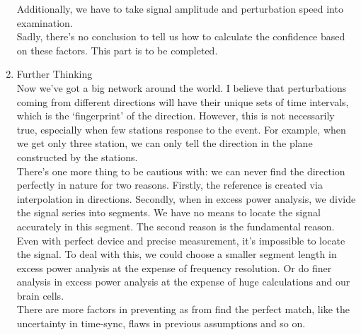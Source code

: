 \documentclass[
12pt, %
a4paper %
]{extreport}
\theoremstyle{plain}
\begin{document}
\begin{enumerate}
Additionally, we have to take signal amplitude and perturbation speed into examination. \\
Sadly, there’s no conclusion to tell us how to calculate the confidence based on these factors. This part is to be completed.
\item Further Thinking\\
Now we’ve got a big network around the world. I believe that perturbations coming from different directions will have their unique sets of time intervals, which is the ‘fingerprint’ of the direction. However, this is not necessarily true, especially when few stations response to the event. For example, when we get only three station, we can only tell the direction in the plane constructed by the stations.\\
There’s one more thing to be cautious with: we can never find the direction perfectly in nature for two reasons. Firstly, the reference is created via interpolation in directions. Secondly, when in excess power analysis, we divide the signal series into segments. We have no means to locate the signal accurately in this segment. The second reason is the fundamental reason. Even with perfect device and precise measurement, it’s impossible to locate the signal. To deal with this, we could choose a smaller segment length in excess power analysis at the expense of frequency resolution. Or do finer analysis in excess power analysis at the expense of huge calculations and our brain cells.\\
There are more factors in preventing as from find the perfect match, like the uncertainty in time-sync, flaws in previous assumptions and so on.\\
\end{enumerate}
\end{document}
